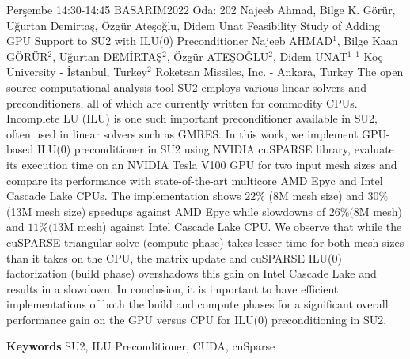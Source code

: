 
    \begin{abstract_basarim}
    {Perşembe 14:30-14:45}
    {BASARIM2022}
    {Oda: 202}
    {Najeeb Ahmad, Bilge K. Görür, Uğurtan Demirtaş, Özgür Ateşoğlu, Didem Unat}
    {Feasibility Study of Adding GPU Support to SU2 with ILU(0) Preconditioner}
    {%
    Najeeb AHMAD$^{1}$, Bilge Kaan GÖRÜR$^{2}$, Uğurtan DEMİRTAŞ$^{2}$, Özgür ATEŞOĞLU$^{2}$, Didem UNAT$^{1}$}
    {%
    }
    {%
    $^1$ Koç University - İstanbul, Turkey\newline{}$^2$ Roketsan Missiles, Inc. - Ankara, Turkey}
    The open source computational analysis tool SU2 employs various linear solvers and preconditioners, all of which are currently written for commodity CPUs. Incomplete LU (ILU) is one such important preconditioner available in SU2, often used in linear solvers such as GMRES. In this work, we implement GPU-based ILU(0) preconditioner in SU2 using NVIDIA cuSPARSE library, evaluate its execution time on an NVIDIA Tesla V100 GPU for two input mesh sizes and compare its performance with state-of-the-art multicore AMD Epyc and Intel Cascade Lake CPUs. The implementation shows $22 \%$ (8M mesh size) and $30 \%$ (13M mesh size) speedups against AMD Epyc while slowdowns of $26 \%(8 \mathrm{M}$ mesh) and $11 \%(13 \mathrm{M}$ mesh) against Intel Cascade Lake CPU. We observe that while the cuSPARSE triangular solve (compute phase) takes lesser time for both mesh sizes than it takes on the CPU, the matrix update and cuSPARSE ILU(0) factorization (build phase) overshadows this gain on Intel Cascade Lake and results in a slowdown. In conclusion, it is important to have efficient implementations of both the build and compute phases for a significant overall performance gain on the GPU versus CPU for ILU(0) preconditioning in SU2. 
    
        \textbf{Keywords} \newline{}SU2, ILU Preconditioner, CUDA, cuSparse
    \end{abstract_basarim}
    